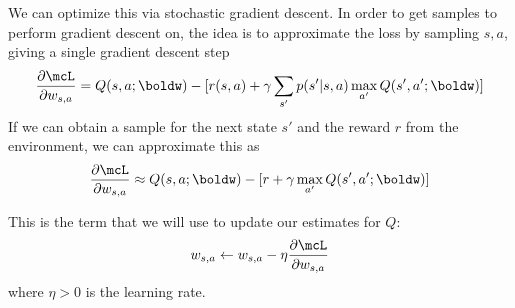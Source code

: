 \documentclass[12pt]{article}
\begin{document}
We can optimize this via stochastic gradient descent. In order to get samples to perform gradient descent on, the idea is to approximate the loss by sampling $s,a$, giving a single gradient descent step
\begin{align}\frac{\partial \mcL}{\partial w_{s,a}} = Q(s,a;\boldw) - [r(s,a) + \gamma \sum_{s'}p(s'|s, a)\max_{a'}Q(s', a'; \boldw)]\end{align}
If we can obtain a sample for the next state $s'$ and the reward $r$ from the environment, we can approximate this as
\begin{align}\frac{\partial \mcL}{\partial w_{s,a}} \approx Q(s,a;\boldw) - [r + \gamma \max_{a'}Q(s', a'; \boldw)]\end{align}

This is the term that we will use to update our estimates for $Q$:
\begin{align}
    w_{s,a} \leftarrow w_{s,a} - \eta\frac{\partial \mcL}{\partial w_{s,a}}
\end{align}
where $\eta>0$ is the learning rate.
\end{document}
